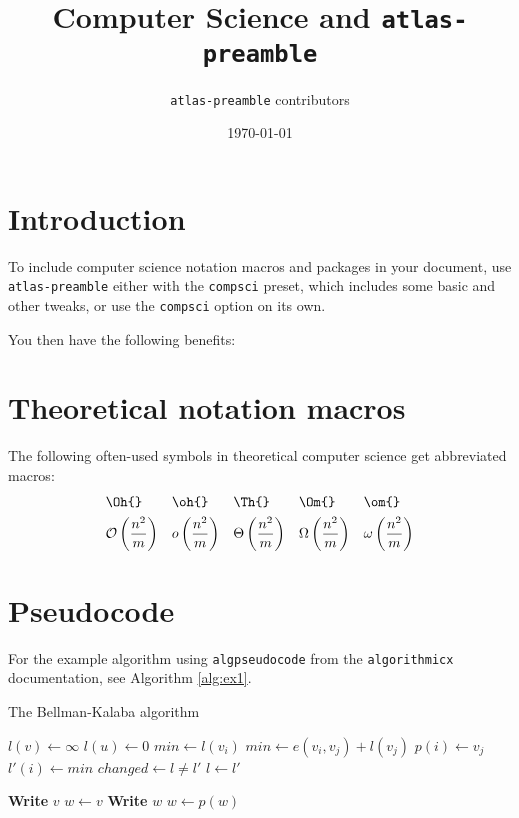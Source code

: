 \documentclass[11pt, a4paper]{article}
\title{Computer Science and \texttt{atlas-preamble}}
\author{\texttt{atlas-preamble} contributors}
\date{\today}
\begin{document}
\maketitle


\section{Introduction}
To include computer science notation macros and packages in your document, use \texttt{atlas-preamble} either with the \texttt{compsci} preset, which includes some basic and other tweaks, or use the \texttt{compsci} option on its own.

\noindent
You then have the following benefits:



\section{Theoretical notation macros}
The following often-used symbols in theoretical computer science get abbreviated macros:
\begin{align*}
	&\texttt{\textbackslash Oh\{\}} & &\texttt{\textbackslash oh\{\}} & &\texttt{\textbackslash Th\{\}} & &\texttt{\textbackslash Om\{\}} & &\texttt{\textbackslash om\{\}} \\
	&\mathcal{O}\left(\frac{n^2}{m}\right) & &o\left(\frac{n^2}{m}\right) & &\Theta\left(\frac{n^2}{m}\right) & &\Omega\left(\frac{n^2}{m}\right) & &\omega\left(\frac{n^2}{m}\right)
\end{align*}



\section{Pseudocode}
For the example algorithm using \texttt{algpseudocode} from the \texttt{algorithmicx} documentation, see Algorithm \ref{alg:ex1}.

\begin{algorithm}
\label{alg:ex1}
\caption{The Bellman-Kalaba algorithm}
    \begin{algorithmic}[1]
            \State $l(v) \leftarrow \infty$
        \EndFor
        \State $l(u) \leftarrow 0$
        \Repeat
                \State $min \leftarrow l(v_i)$
                        \State $min \leftarrow e(v_i, v_j) + l(v_j)$
                        \State $p(i) \leftarrow v_j$
                    \EndIf
                \EndFor
                \State $l'(i) \leftarrow min$
            \EndFor
            \State $changed \leftarrow l \not= l'$
            \State $l \leftarrow l'$
    \EndProcedure
    
    \Statex
            \State \textbf{Write} $v$
        \Else
            \State $w \leftarrow v$
                \State \textbf{Write} $w$
                \State $w \leftarrow p(w)$
            \EndWhile
        \EndIf
    \EndProcedure
    \end{algorithmic}
\end{algorithm}
\end{document}
